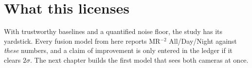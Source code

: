\documentclass[../main.tex]{subfiles}
\begin{document}
\section{What this licenses}

With trustworthy baselines and a quantified noise floor, the study has its yardstick. Every fusion
model from here reports MR$^{-2}$ All/Day/Night against \emph{these} numbers, and a claim of
improvement is only entered in the ledger if it clears $2\sigma$. The next chapter builds the first
model that sees both cameras at once.
\end{document}
